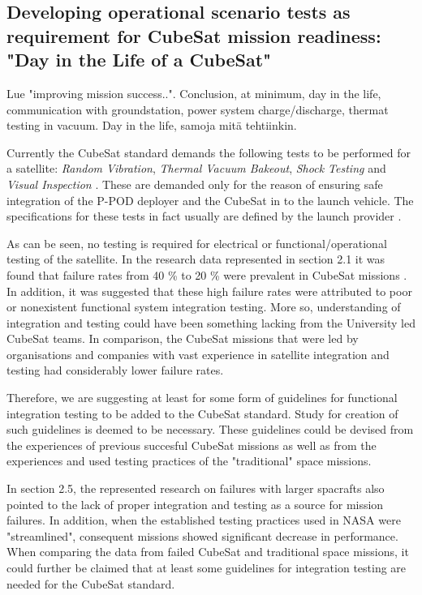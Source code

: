 \documentclass[english,12pt,a4paper,pdftex,elec,utf8]{aaltothesis}
\begin{document}
\subsection{Developing operational scenario tests as requirement for CubeSat mission readiness: "Day in the Life of a CubeSat"}
Lue "improving mission success..". Conclusion, at minimum, day in the life, communication with groundstation, power system charge/discharge, thermat testing in vacuum. Day in the life, samoja mitä tehtiinkin.\par
Currently the CubeSat standard demands the following tests to be performed for a satellite: \textit{Random Vibration}, \textit{Thermal Vacuum Bakeout}, \textit{Shock Testing} and \textit{Visual Inspection} \cite{cds}. These are demanded only for the reason of ensuring safe integration of the P-POD deployer and the CubeSat in to the launch vehicle. The specifications for these tests in fact usually are defined by the launch provider \cite{cds}.\par 
As can be seen, no testing is required for electrical or functional/operational testing of the satellite. In the research data represented in section 2.1 it was found that failure rates from 40 \% to 20 \% were prevalent in CubeSat missions \cite{Swart1, Swart2016, Swart2015}. In addition, it was suggested that these high failure rates were attributed to poor or nonexistent functional system integration testing. More so, understanding of integration and testing could have been something lacking from the University led CubeSat teams. In comparison, the CubeSat missions that were led by organisations and companies with vast experience in satellite integration and testing had considerably lower failure rates.\par 
Therefore, we are suggesting at least for some form of guidelines for functional integration testing to be added to the CubeSat standard. Study for creation of such guidelines is deemed to be necessary. These guidelines could be devised from the experiences of previous succesful CubeSat missions as well as from the experiences and used testing practices of the "traditional" space missions.\par
In section 2.5, the represented research on failures with larger spacrafts also pointed to the lack of proper integration and testing as a source for mission failures. In addition, when the established testing practices used in NASA were "streamlined", consequent missions showed significant decrease in performance. When comparing the data from failed CubeSat and traditional space missions, it could further be claimed that at least some guidelines for integration testing are needed for the CubeSat standard. \par
\end{document}
